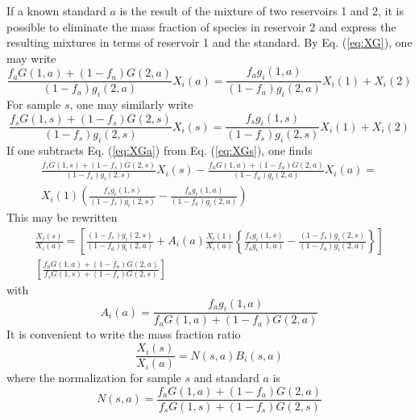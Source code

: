 \documentclass[preprint]{revtex4-2}
\begin{document}
If a known standard $a$ is the result of the mixture of two reservoirs 1 and 2,
it is possible to eliminate the mass fraction of species in reservoir 2
and express the resulting mixtures in terms of reservoir 1 and the standard.
By Eq. (\ref{eq:XG}), one may write
\begin{equation}
\frac{f_a G(1, a) + \left(1 - f_a\right) G(2, a)}{\left(1 - f_a\right) g_i(2, a)}
X_i(a)
= \frac{f_a g_i(1, a)}{\left(1 - f_a\right) g_i(2, a)} X_i(1) + X_i(2)
\label{eq:XGa}
\end{equation}
For sample $s$, one may similarly write
\begin{equation}
\frac{f_s G(1, s) + \left(1 - f_s\right) G(2, s)}{\left(1 - f_s\right) g_i(2, s)}
X_i(s)
= \frac{f_s g_i(1, s)}{\left(1 - f_s\right) g_i(2, s)} X_i(1) + X_i(2)
\label{eq:XGs}
\end{equation}
If one subtracts Eq. (\ref{eq:XGa}) from Eq. (\ref{eq:XGs}), one finds
\begin{multline}
\frac{f_s G(1, s) + \left(1 - f_s\right) G(2, s)}{\left(1 - f_s\right) g_i(2, s)}
X_i(s)
-
\frac{f_a G(1, a) + \left(1 - f_a\right) G(2, a)}{\left(1 - f_a\right) g_i(2, a)}
X_i(a)
= \\
X_i(1) \left(
\frac{f_s g_i(1, s)}{\left(1 - f_s\right) g_i(2, s)}
- \frac{f_a g_i(1, a)}{\left(1 - f_a\right) g_i(2, a)}\right)
\label{eq:XGdiff}
\end{multline}
This may be rewritten
\begin{multline}
\frac{X_i(s)}{X_i(a)}
=
\left[
\frac{(1 - f_s) g_i(2, s)}{(1 - f_a) g_i(2, a)}
+
A_i(a)\frac{X_i(1)}{X_i(a)}
\left\{
\frac{f_s g_i(1, s)}{f_a g_i(1, a)}
- \frac{\left(1 - f_s\right) g_i(2, s)}{\left(1 - f_a\right) g_i(2, a)}\right\}
\right]
\\
\left[\frac{f_a G(1, a) + (1 - f_a) G(2,a)}{f_s G(1, s) + (1 - f_s) G(2,s)}\right]
\label{eq:XGdiff2}
\end{multline}
with
\begin{equation}
A_i(a) = \frac{f_a g_i(1, a)}{f_a G(1, a) + (1 - f_a) G(2,a)}
\label{eq:A}
\end{equation}
It is convenient to write the mass fraction ratio
\begin{equation}
\frac{X_i(s)}{X_i(a)} = N(s, a) B_i(s, a)
\label{eq:Xi}
\end{equation}
where the normalization for sample $s$ and standard $a$ is
\begin{equation}
N(s, a) = \frac{f_a G(1, a) + (1 - f_a) G(2,a)}{f_s G(1, s) + (1 - f_s) G(2,s)}
\label{eq:norm}
\end{equation}
\end{document}
